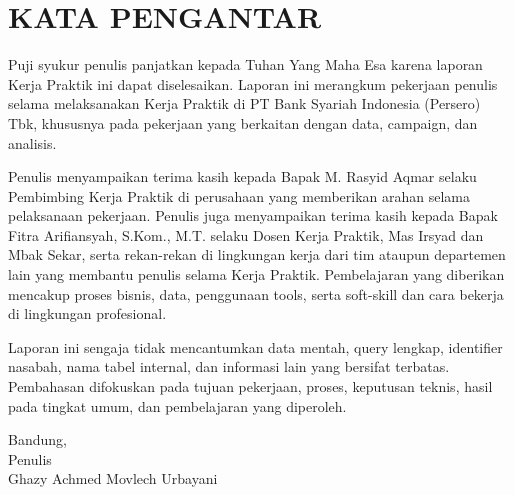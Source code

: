 \chapter*{KATA PENGANTAR}
Puji syukur penulis panjatkan kepada Tuhan Yang Maha Esa karena laporan Kerja Praktik ini dapat diselesaikan. Laporan ini merangkum pekerjaan penulis selama melaksanakan Kerja Praktik di PT Bank Syariah Indonesia (Persero) Tbk, khususnya pada pekerjaan yang berkaitan dengan data, campaign, dan analisis.

Penulis menyampaikan terima kasih kepada Bapak M. Rasyid Aqmar selaku Pembimbing Kerja Praktik di perusahaan yang memberikan arahan selama pelaksanaan pekerjaan. Penulis juga menyampaikan terima kasih kepada Bapak Fitra Arifiansyah, S.Kom., M.T. selaku Dosen Kerja Praktik, Mas Irsyad dan Mbak Sekar, serta rekan-rekan di lingkungan kerja dari tim ataupun departemen lain yang membantu penulis selama Kerja Praktik. Pembelajaran yang diberikan mencakup proses bisnis, data, penggunaan tools, serta soft-skill dan cara bekerja di lingkungan profesional.

Laporan ini sengaja tidak mencantumkan data mentah, query lengkap, identifier nasabah, nama tabel internal, dan informasi lain yang bersifat terbatas. Pembahasan difokuskan pada tujuan pekerjaan, proses, keputusan teknis, hasil pada tingkat umum, dan pembelajaran yang diperoleh.

\begin{flushright}
Bandung, \DTMbahasaimonthname{\month}\ \the\year\\
Penulis\\
\vspace{1.5cm}
Ghazy Achmed Movlech Urbayani
\end{flushright}
